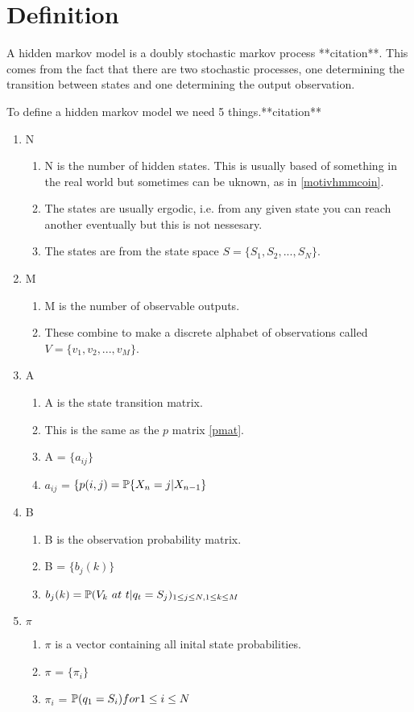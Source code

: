 \section{Definition}

A hidden markov model is a doubly stochastic markov process **citation**. This comes from the fact that there are two stochastic processes, one determining the transition between states and one determining the output observation. 

To define a hidden markov model we need 5 things.**citation**
\begin{enumerate}
    \item N \begin{enumerate}[i]
        \item N is the number of hidden states. This is usually based of something in the real world but sometimes can be uknown, as in \ref{motivhmmcoin}.
        \item The states are usually ergodic, i.e. from any given state you can reach another eventually but this is not nessesary.
        \item The states are from the state space $S = \{S_1,S_2,...,S_N\}$.
        \end{enumerate}
    \item M \begin{enumerate}[i]
        \item M is the number of observable outputs.
        \item These combine to make a discrete alphabet of observations called $V = \{v_1, v_2,...,v_M\}$.
    \end{enumerate}
    \item A \begin{enumerate}[i]
        \item A is the state transition matrix.
        \item This is the same as the $p$ matrix \ref{pmat}. 
        \item A = $\{a_{ij}\}$ 
        \item $a_{ij}$ = $\{ p(i,j) = \mathbb{P} \{ X_n = j | X_{n-1}\}$
    \end{enumerate}
    \item B \begin{enumerate}[i]
        \item B is the observation probability matrix.
        \item B = $\{b_j(k)\}$
        \item $b_j(k) = \mathbb{P} (V_k \  at \  t | q_t = S_j)_{1 \leq j \leq N, 1 \leq k \leq M}$
    \end{enumerate}
    \item $\pi$ \begin{enumerate}[i]
        \item $\pi$ is a vector containing all inital state probabilities. 
        \item $\pi$ = $\{ \pi_i \}$
        \item $\pi_i$ = $\mathbb{P} (q_1 = S_i) for 1 \leq i \leq N$
    \end{enumerate}
\end{enumerate}

